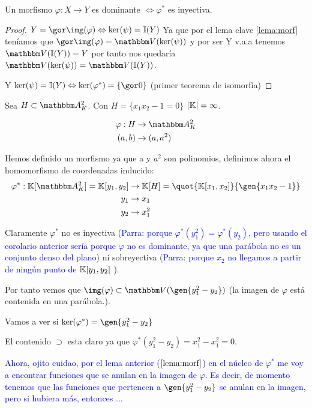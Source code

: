 \begin{corol} \label{cor:morf}
	Un morfismo $\varphi: X \rightarrow Y$ es dominante $\Leftrightarrow \varphi^*$ es inyectiva.
\end{corol}

\begin{proof}
	$Y=\cls{\img(\varphi)} \Leftrightarrow \ker(\psi)=\I(Y)$
	Ya que por el lema clave \ref{lema:morf} teníamos que $\cls{\img(\varphi)}=\V(\ker(\psi))$ y por ser Y v.a.a tenemos $\V(\I(Y))=Y$ por tanto nos quedaría $\V(\ker(\psi))=\V(\I(Y))$.
	
	Y $\ker(\psi)=\I(Y) \Leftrightarrow \ker(\varphi^*)=\{\cls{0}\}$ (primer teorema de isomorfía)
\end{proof}

\begin{example}
	Sea $H \subset  \A^2_K$. Con $H=\{x_1x_2-1=0\}$ $|\mathbb{K}|=\infty$.

	\begin{align*}
		\varphi: H & \rightarrow \A^2_K \\
		(a,b) & \rightarrow (a,a^2)
	\end{align*}


	Hemos definido un morfismo ya que a y $a^2$ son polinomios, definimos ahora el homomorfismo de coordenadas inducido:
	\begin{align*}
		\varphi^*: \K[\A^2_K]=\K[y_1,y_2] & \rightarrow \K[H]=\quot{\K[x_1,x_2]}{\gen{x_1x_2-1}} \\
		y_1 & \rightarrow x_1 \\
		y_2 & \rightarrow x_1^2
	\end{align*}

	Claramente $\varphi^*$ no es inyectiva (\textcolor{blue}{Parra: porque $\varphi^*(y_1^2)=\varphi^*(y_2)$, pero usando el corolario anterior sería porque $\varphi$ no es dominante, ya que una parábola no es un conjunto denso del plano}) ni sobreyectiva (\textcolor{blue}{Parra: porque $x_2$ no llegamos a partir de ningún punto de $\mathbb{K}[y_1,y_2]$} ).

    Por tanto vemos que $\img(\varphi) \subset \V(\gen{y_1^2-y_2})$ (la imagen de $\varphi$ está contenida en una parábola.).

    Vamos a ver si $\ker(\varphi^*)=\gen{y_1^2-y_2}$

	El contenido $\supset$ esta claro ya que $\varphi^*(y_1^2-y_2)=x_1^2-x_1^2=0$.

	\textcolor{blue}{Ahora, ojito cuidao, por el lema anterior ($\ref{lema:morf}$) en el núcleo de $\varphi^*$ me voy a encontrar funciones que se anulan en la imagen de $\varphi$. Es decir, de momento tenemos que las funciones que pertencen a $\gen{y_1^2-y_2}$ se anulan en la imagen, pero si hubiera más, entonces ...}


\end{example}
